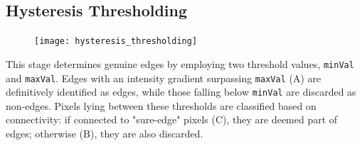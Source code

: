 \subsection{Hysteresis Thresholding}

\begin{figure}
    \centering
    \vspace{-16mm}
    \texttt{[image: hysteresis\_thresholding]}
    \vspace{-20mm}
\end{figure}

This stage determines genuine edges by employing two threshold values, \texttt{minVal} and \texttt{maxVal}.
Edges with an intensity gradient surpassing \texttt{maxVal} (A) are definitively identified as edges,
while those falling below \texttt{minVal} are discarded as non-edges.
Pixels lying between these thresholds are classified based on connectivity: if connected to "sure-edge" pixels (C),
they are deemed part of edges; otherwise (B), they are also discarded.
